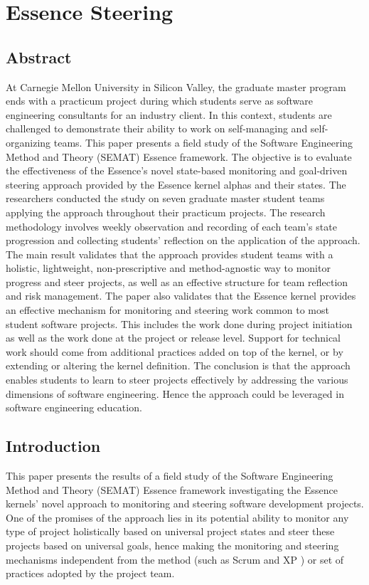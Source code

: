 \chapter{Essence Steering}
\section{Abstract}
At Carnegie Mellon University in Silicon Valley, the graduate master program ends with a practicum project during which students serve as software engineering consultants for an industry client. In this context, students are challenged to demonstrate their ability to work on self-managing and self-organizing teams. This paper presents a field study of the Software Engineering Method and Theory (SEMAT) Essence framework. The objective is to evaluate the effectiveness of the Essence's novel state-based monitoring and goal-driven steering approach provided by the Essence kernel alphas and their states. The researchers conducted the study on seven graduate master student teams applying the approach throughout their practicum projects. The research methodology involves weekly observation and recording of each team's state progression and collecting students' reflection on the application of the approach. The main result validates that the approach provides student teams with a holistic, lightweight, non-prescriptive and method-agnostic way to monitor progress and steer projects, as well as an effective structure for team reflection and risk management. The paper also validates that the Essence kernel provides an effective mechanism for monitoring and steering work common to most student software projects. This includes the work done during project initiation as well as the work done at the project or release level. Support for technical work should come from additional practices added on top of the kernel, or by extending or altering the kernel definition. The conclusion is that the approach enables students to learn to steer projects effectively by addressing the various dimensions of software engineering. Hence the approach could be leveraged in software engineering education.

\section{Introduction}

This paper presents the results of a field study of the Software Engineering Method and Theory (SEMAT) Essence framework \cite{SEMATKernel, EssenceBook} investigating the Essence kernels' novel approach to monitoring and steering software development projects. One of the promises of the approach lies in its potential ability to monitor any type of project holistically based on universal project states and steer these projects based on universal goals, hence making the monitoring and steering mechanisms independent from the method (such as Scrum \cite{AgileProjectManagement} and XP \cite{BeckExtremeProgramming2000}) or set of practices adopted by the project team.

